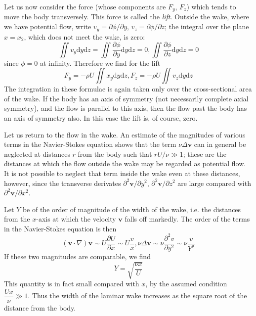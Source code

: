 \documentclass[conference]{IEEEtran}
\theoremstyle{definition}
\theoremstyle{remark}
\begin{document}
    Let us now consider the force (whose components are $F_y$, $F_z$) which tends to move the body transversely. This force is called the \emph{lift}. Outside the wake, where we have potential flow, write $v_y = \partial \phi / \partial y$, $v_z = \partial \phi / \partial z$; the integral over the plane $x = x_2$, which does not meet the wake, is zero:
    \begin{equation*}
        \iint v_y \mathrm{d} y \mathrm{d} z = \iint \dfrac{\partial \phi}{\partial y} \mathrm{d} y \mathrm{d} z = 0, \iint \dfrac{\partial \phi}{\partial z} \mathrm{d} y \mathrm{d} z = 0
    \end{equation*}
    since $\phi = 0$ at infinity. Therefore we find for the lift
    \begin{equation}
        F_y = -\rho U \iint x_y \mathrm{d} y \mathrm{d} z, F_z = -\rho U \iint v_z \mathrm{d} y \mathrm{d} z
    \end{equation}
    The integration in these formulae is again taken only over the cross-sectional area of the wake. If the body has an axis of symmetry (not necessarily complete axial symmetry), and the flow is parallel to this axis, then the flow past the body has an axis of symmetry also. In this case the lift is, of course, zero.

    Let us return to the flow in the wake. An estimate of the magnitudes of various terms in the Navier-Stokes equation shows that the term $\nu \Delta \mathbf{v}$ can in general be neglected at distances $r$ from the body such that $rU/\nu \gg 1$; these are the distances at which the flow outside the wake may be regarded as potential flow. It is not possible to neglect that term inside the wake even at these distances, however, since the transverse derivates $\partial^2 \mathbf{v} / \partial y^2$, $\partial^2 \mathbf{v} / \partial z^2$ are large compared with $\partial^2 \mathbf{v} / \partial x^2$.

    Let $Y$ be of the order of magnitude of the width of the wake, i.e. the distances from the $x$-axis at which the velocity $\mathbf{v}$ falls off markedly. The order of the terms in the Navier-Stokes equation is then
    \begin{equation*}
        (\mathbf{v} \cdot \nabla) \mathbf{v} \sim U \dfrac{\partial U}{\partial x} \sim U \dfrac{v}{x}, \nu \Delta \mathbf{v} \sim \nu \dfrac{\partial^2 v}{\partial y^2} \sim \nu \dfrac{v}{Y^2}
    \end{equation*}
    If these two magnitudes are comparable, we find
    \begin{equation}
        Y = \sqrt{\dfrac{\nu x}{U}}
        \label{eq:comparable_magnitude}
    \end{equation}
    This quantity is in fact small compared with $x$, by the assumed condition $\dfrac{Ux}{\nu} \gg 1$. Thus the width of the laminar wake increases as the square root of the distance from the body.
\end{document}
